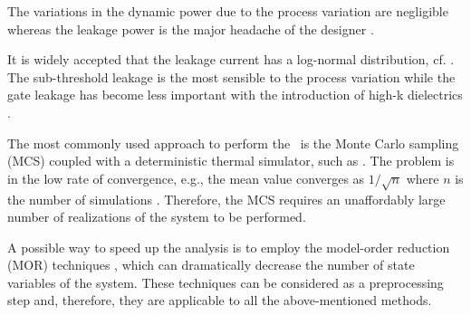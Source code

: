 The variations in the dynamic power due to the process variation are negligible whereas the leakage power is the major headache of the designer \cite{juan2012, srivastava2010}.

It is widely accepted that the leakage current has a log-normal distribution, cf. \cite{juan2012, srivastava2010}. The sub-threshold leakage is the most sensible to the process variation while the gate leakage has become less important with the introduction of high-k dielectrics \cite{juan2012}.

The most commonly used approach to perform the \sta\ is the Monte Carlo sampling (MCS) coupled with a deterministic thermal simulator, such as \cite{huang2006}. The problem is in the low rate of convergence, e.g., the mean value converges as $1/\sqrt{n}$ where $n$ is the number of simulations \cite{xiu2009}. Therefore, the MCS requires an unaffordably large number of realizations of the system to be performed.

A possible way to speed up the analysis is to employ the model-order reduction (MOR) techniques \cite{benner2011}, which can dramatically decrease the number of state variables of the system. These techniques can be considered as a preprocessing step and, therefore, they are applicable to all the above-mentioned methods.

